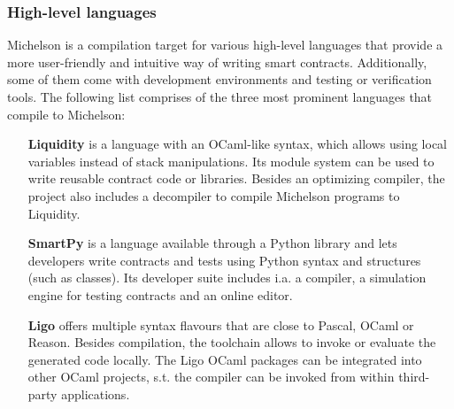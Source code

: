 \subsubsection{High-level languages}
Michelson is a compilation target for various high-level languages that provide a more user-friendly and intuitive way of writing smart contracts. Additionally, some of them come with development environments and testing or verification tools. The following list comprises of the three most prominent languages that compile to Michelson:
\begin{itemize}
\item[\textbf{Liquidity}] \cite{liquidity} is a language with an OCaml-like syntax, which allows using local variables instead of stack manipulations. Its module system can be used to write reusable contract code or libraries. Besides an optimizing compiler, the project also includes a decompiler to compile Michelson programs to Liquidity.
\item[\textbf{SmartPy}] \cite{smartpy} is a language available through a Python library and lets developers write contracts and tests using Python syntax and structures (such as classes). Its developer suite includes i.a. a compiler, a simulation engine for testing contracts and an online editor.
\item [\textbf{Ligo}] \cite{ligo} offers multiple syntax flavours that are close to Pascal, OCaml or Reason. Besides compilation, the toolchain allows to invoke or evaluate the generated code locally. The Ligo OCaml packages can be integrated into other OCaml projects, s.t. the compiler can be invoked from within third-party applications.
\end{itemize}

